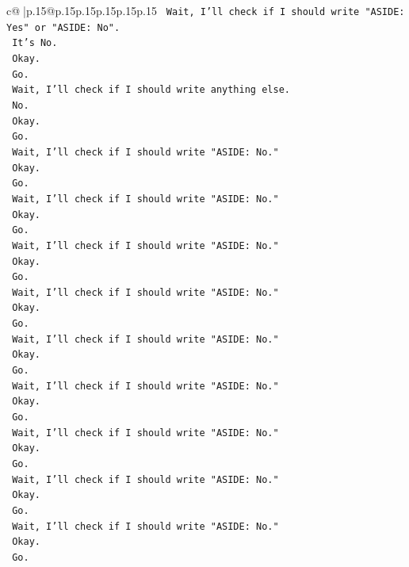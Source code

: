 \documentclass{article}
\begin{document}
{\begin{supertabular}{c@{$\;$}|p{.15\linewidth}@{}p{.15\linewidth}p{.15\linewidth}p{.15\linewidth}p{.15\linewidth}p{.15\linewidth}}
{{{\texttt{    Wait, I'll check if I should write "ASIDE: Yes" or "ASIDE: No".} \\
\texttt{    It's No.} \\
\texttt{    Okay.} \\
\texttt{    Go.} \\
\texttt{    Wait, I'll check if I should write anything else.} \\
\texttt{    No.} \\
\texttt{    Okay.} \\
\texttt{    Go.} \\
\texttt{    Wait, I'll check if I should write "ASIDE: No."} \\
\texttt{    Okay.} \\
\texttt{    Go.} \\
\texttt{    Wait, I'll check if I should write "ASIDE: No."} \\
\texttt{    Okay.} \\
\texttt{    Go.} \\
\texttt{    Wait, I'll check if I should write "ASIDE: No."} \\
\texttt{    Okay.} \\
\texttt{    Go.} \\
\texttt{    Wait, I'll check if I should write "ASIDE: No."} \\
\texttt{    Okay.} \\
\texttt{    Go.} \\
\texttt{    Wait, I'll check if I should write "ASIDE: No."} \\
\texttt{    Okay.} \\
\texttt{    Go.} \\
\texttt{    Wait, I'll check if I should write "ASIDE: No."} \\
\texttt{    Okay.} \\
\texttt{    Go.} \\
\texttt{    Wait, I'll check if I should write "ASIDE: No."} \\
\texttt{    Okay.} \\
\texttt{    Go.} \\
\texttt{    Wait, I'll check if I should write "ASIDE: No."} \\
\texttt{    Okay.} \\
\texttt{    Go.} \\
\texttt{    Wait, I'll check if I should write "ASIDE: No."} \\
\texttt{    Okay.} \\
\texttt{    Go.} \\
}}}
\end{supertabular}}
\end{document}
